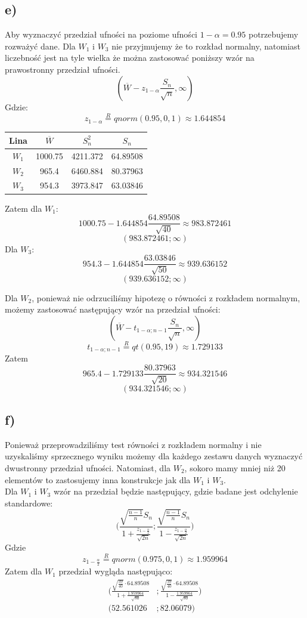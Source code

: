 \documentclass{article}
\begin{document}
\subsection{e)}
Aby wyznaczyć przedział ufności na poziome ufności $1 - \alpha = 0.95$ potrzebujemy rozważyć dane. Dla $W_1$ i $W_3$ nie przyjmujemy że to rozkład normalny, natomiast liczebność jest na tyle wielka że można zastosować poniższy wzór na prawostronny przedział ufności.
\[ ( \overline{W} - z_{1 - \alpha} \frac{S_n}{\sqrt{n}} , \infty ) \]
Gdzie:
\[ z_{1 - \alpha} \overset{R}{=} qnorm(0.95, 0, 1) \approx 1.644854 \]
\begin{center} \begin{tabular}{|c|c|c|c|} \hline
Lina & $\overline{W}$ & $S_n^2$ & $S_n$ \\ \hline
$W_1$ & 1000.75 & 4211.372 & 64.89508 \\ \hline
$W_2$ & 965.4 & 6460.884 & 80.37963 \\ \hline
$W_3$ & 954.3 & 3973.847 & 63.03846 \\ \hline
\end{tabular} \end{center}

Zatem dla $W_1$:
\[ 1000.75 - 1.644854 \frac{64.89508}{\sqrt{40}} \approx 983.872461 \]
\[ ( 983.872461 ; \infty ) \]
Dla $W_3$:
\[ 954.3 - 1.644854 \frac{63.03846}{\sqrt{50}} \approx 939.636152 \]
\[ ( 939.636152 ; \infty ) \]

Dla $W_2$, ponieważ nie odrzuciliśmy hipotezę o równości z rozkładem normalnym, możemy zastosować następujący wzór na przedział ufności:
\[ ( \overline{W} - t_{1 - \alpha; n-1} \frac{S_n}{\sqrt{n}} , \infty ) \]
\[ t_{1 - \alpha; n-1} \overset{R}{=} qt(0.95, 19) \approx 1.729133 \]
Zatem
\[ 965.4 - 1.729133 \frac{80.37963}{\sqrt{20}} \approx 934.321546 \]
\[ ( 934.321546 ; \infty ) \]

\subsection{f)}
Ponieważ przeprowadziliśmy test równości z rozkładem normalny i nie uzyskaliśmy sprzecznego wyniku możemy dla każdego zestawu danych wyznaczyć dwustronny przedział ufności. Natomiast, dla $W_2$, sokoro mamy mniej niż 20 elementów to zastosujemy inna konstrukcje jak dla $W_1$ i $W_3$. \\
Dla $W_1$ i $W_3$ wzór na przedział będzie następujący, gdzie badane jest odchylenie standardowe:
\[ \Big( \frac{\sqrt{\frac{n-1}{n}} S_n}{1 + \frac{z_{1-\frac{\alpha}{2}}}{\sqrt{2n}} } ; \frac{\sqrt{\frac{n-1}{n}} S_n}{1 - \frac{z_{1-\frac{\alpha}{2}}}{\sqrt{2n}} } \Big) \]
Gdzie
\[ z_{1-\frac{\alpha}{2}} \overset{R}{=} qnorm(0.975, 0, 1) \approx 1.959964 \]
Zatem dla $W_1$ przedział wygląda następująco:
\begin{align*}
\Big( \frac{\sqrt{\frac{39}{40}} \cdot 64.89508}{1 + \frac{1.959964}{\sqrt{80}} } & ; \frac{\sqrt{\frac{39}{40}} \cdot 64.89508}{1 - \frac{1.959964}{\sqrt{80}} } \Big) \\
( 52.561026 &; 82.06079 )
\end{align*}
\end{document}
